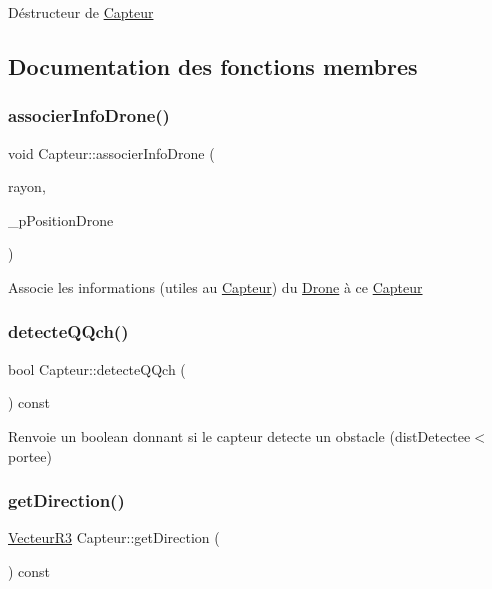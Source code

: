 Déstructeur de \mbox{\hyperlink{class_capteur}{Capteur}} 

\subsection{Documentation des fonctions membres}
\mbox{\label{class_capteur_aa25dc5f9211e43691bd8351265a2b3b3}} 
\subsubsection{\texorpdfstring{associer\+Info\+Drone()}{associerInfoDrone()}}
{\footnotesize\ttfamily void Capteur\+::associer\+Info\+Drone (\begin{DoxyParamCaption}\item[{const float}]{rayon,  }\item[{\mbox{\hyperlink{class_vecteur_r3}{Vecteur\+R3}} $\ast$}]{\+\_\+p\+Position\+Drone }\end{DoxyParamCaption})}

Associe les informations (utiles au \mbox{\hyperlink{class_capteur}{Capteur}}) du \mbox{\hyperlink{class_drone}{Drone}} à ce \mbox{\hyperlink{class_capteur}{Capteur}} \mbox{\label{class_capteur_a0229c6b8fc7838932c53157eb3110b5b}} 
\subsubsection{\texorpdfstring{detecte\+Q\+Qch()}{detecteQQch()}}
{\footnotesize\ttfamily bool Capteur\+::detecte\+Q\+Qch (\begin{DoxyParamCaption}{ }\end{DoxyParamCaption}) const}

Renvoie un boolean donnant si le capteur detecte un obstacle (dist\+Detectee$<$portee) \mbox{\label{class_capteur_aa92b7552969206047df939d641cfb802}} 
\subsubsection{\texorpdfstring{get\+Direction()}{getDirection()}}
{\footnotesize\ttfamily \mbox{\hyperlink{class_vecteur_r3}{Vecteur\+R3}} Capteur\+::get\+Direction (\begin{DoxyParamCaption}{ }\end{DoxyParamCaption}) const}

